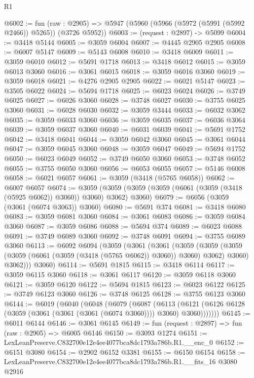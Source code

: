 \begin{lexlean}{R1}
\begin{coremodule}
@6002 := fun (raw : @2905) =>
  @5947 (@5960 (@5966 (@5972 (@5991 (@5992 @2466)) @5265)) (@3726 @5952))
@6003 := (request : @2897) -> @5099
@6004 := @3418 @5144
@6005 := @3059 @6004
@6007 := @4445 @2905 @2905
@6008 := @6007 @5147
@6009 := @5143 @6008
@6010 := @3418 @6009
@6011 := @3059 @6010
@6012 := @5691 @1718
@6013 := @3418 @6012
@6015 := @3059 @6013 @3060
@6016 := @3061 @6015
@6018 := @3059 @6016 @3060
@6019 := @3059 @6018
@6021 := @4276 @2905 @2905
@6022 := @6021 @5147
@6023 := @3505 @6022
@6024 := @5694 @1718
@6025 := @6023 @6024
@6026 := @3749 @6025
@6027 := @6026 @3060
@6028 := @3748 @6027
@6030 := @3755 @6025 @3060
@6031 := @6028 @6030
@6032 := @3059 @3444
@6033 := @6032 @3062
@6035 := @3059 @6033 @3060
@6036 := @3059 @6035
@6037 := @6036 @3064
@6039 := @3059 @6037 @3060
@6040 := @6031 @6039
@6041 := @5691 @1752
@6042 := @3418 @6041
@6044 := @3059 @6042 @3060
@6045 := @3061 @6044
@6047 := @3059 @6045 @3060
@6048 := @3059 @6047
@6049 := @5694 @1752
@6050 := @6023 @6049
@6052 := @3749 @6050 @3060
@6053 := @3748 @6052
@6055 := @3755 @6050 @3060
@6056 := @6053 @6055
@6057 := @5146 @6008
@6058 := @6021 @6057
@6061 := @3059 (@3418 (@5765 @6058))
@6062 := @6007 @6057
@6074 := @3059 (@3059 (@3059 (@3059 (@6061 (@3059 (@3418 (@5925 @6062)) @3060)) @3060) @3062) @3060)
@6079 := @6056 (@3059 (@3061 (@6074 @3063)) @3060)
@6080 := @5691 @374
@6081 := @3418 @6080
@6083 := @3059 @6081 @3060
@6084 := @3061 @6083
@6086 := @3059 @6084 @3060
@6087 := @3059 @6086
@6088 := @5694 @374
@6089 := @6023 @6088
@6091 := @3749 @6089 @3060
@6092 := @3748 @6091
@6094 := @3755 @6089 @3060
@6113 := @6092
    @6094
    (@3059
      (@3061
        (@3061
          (@3059
            (@3059 (@3059 (@3059 (@6061 (@3059 (@3418 (@5765 @6062)) @3060)) @3060) @3062) @3060)
            @3062)))
      @3060)
@6114 := @5691 @1815
@6115 := @3418 @6114
@6117 := @3059 @6115 @3060
@6118 := @3061 @6117
@6120 := @3059 @6118 @3060
@6121 := @3059 @6120
@6122 := @5694 @1815
@6123 := @6023 @6122
@6125 := @3749 @6123 @3060
@6126 := @3748 @6125
@6128 := @3755 @6123 @3060
@6144 := @6019
    (@6040
      (@6048
        (@6079
          (@6087
            (@6113
              (@6121 (@6126 @6128 (@3059 (@3061 (@3061 (@3061 (@6074 @3060)))) @3060) @3060)))))))
@6145 := @6011 @6144
@6146 := @3061 @6145
@6149 := fun (request : @2897) => fun (raw : @2905) => @6005 @6146
@6150 := @3093 @1274
@6151 := LexLeanPreserve.C832700e12e4ee4077bca8dc1793a786b.R1.__enc_0
@6152 := @6151 @3080
@6154 := @2902 @6152 @3381
@6155 := @6150 @6154
@6158 := LexLeanPreserve.C832700e12e4ee4077bca8dc1793a786b.R1.__fits_16 @3080 @2916

\end{coremodule}
\end{lexlean}
